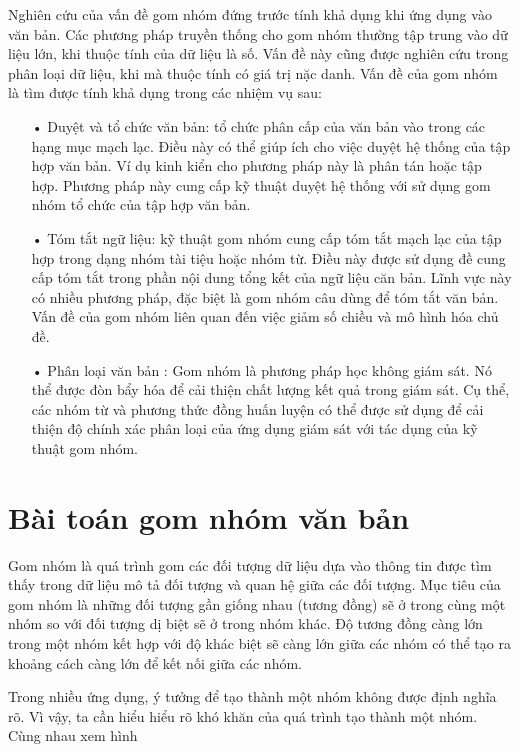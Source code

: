 Nghiên cứu của vấn đề gom nhóm đứng trước tính khả dụng khi ứng dụng vào văn bản. Các phương pháp truyền thống cho gom nhóm thường tập trung vào dữ liệu lớn, khi thuộc tính của dữ liệu là số. Vấn đề này cũng được nghiên cứu trong phân loại dữ liệu, khi mà thuộc tính có giá trị nặc danh. Vấn đề của gom nhóm là tìm được tính khả dụng trong các nhiệm vụ sau:
\begin{enumerate}
\item[•]Duyệt và tổ chức văn bản: tổ chức phân cấp của văn bản vào trong các hạng mục mạch lạc. Điều này có thể giúp ích cho việc duyệt hệ thống của tập hợp văn bản. Ví dụ kinh kiển cho phương pháp này là phân tán hoặc tập hợp. Phương pháp này cung cấp kỹ thuật duyệt hệ thống với sử dụng gom nhóm tổ chức của tập hợp văn bản.
\item[•]Tóm tắt ngữ liệu: kỹ thuật gom nhóm cung cấp tóm tắt mạch lạc của tập hợp trong dạng nhóm tài tiệu hoặc nhóm từ. Điều này được sử dụng đề cung cấp tóm tắt trong phần nội dung tổng kết của ngữ liệu căn bản. Lĩnh vực này có nhiều phương pháp, đặc biệt là gom nhóm câu dùng để tóm tắt văn bản. Vấn đề của gom nhóm liên quan đến việc giảm số chiều và mô hình hóa chủ đề. 
\item[•]Phân loại văn bản : Gom nhóm là phương pháp học không giám sát. Nó thể được đòn bẩy hóa để cải thiện chất lượng kết quả trong giám sát. Cụ thể, các nhóm từ và phương thức đồng huấn luyện có thể được sử dụng để cải thiện độ chính xác phân loại của ứng dụng giám sát với tác dụng của kỹ thuật gom nhóm.
\end{enumerate}

\section{Bài toán gom nhóm văn bản}
Gom nhóm là quá trình gom các đối tượng dữ liệu dựa vào thông tin được tìm thấy trong dữ liệu mô tả đối tượng và quan hệ giữa các đối tượng.
Mục tiêu của gom nhóm là những đối tượng gần giống nhau (tương đồng) sẽ ở trong cùng một nhóm so với đối tượng dị biệt sẽ ở trong nhóm khác.
Độ tương đồng càng lớn trong một nhóm kết hợp với độ khác biệt sẽ càng lớn giữa các nhóm có thể tạo ra khoảng cách càng lớn để kết nối giữa các nhóm.

Trong nhiều ứng dụng, ý tưởng để tạo thành một nhóm không được định nghĩa rõ.
Vì vậy, ta cần hiểu hiểu rõ khó khăn của quá trình tạo thành một nhóm.
Cùng nhau xem hình 

